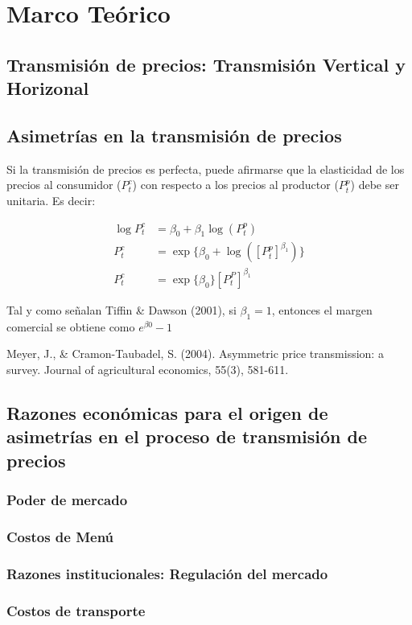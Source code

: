 \chapter{Marco Teórico}

\section{Transmisión de precios: Transmisión Vertical y Horizonal}
\section{Asimetrías en la transmisión de precios}

Si la transmisión de precios es perfecta, puede afirmarse que la elasticidad de los precios al consumidor ($P_{t}^{c}$) con respecto a los precios al productor ($P_{t}^{p}$) debe ser unitaria. Es decir: 

\begin{align}
\log P_{t}^{c} & = \beta_{0}+\beta_{1} \log(P_{t}^{p}) \\ 
P_{t}^{c} & = \exp\{\beta_{0}+ \log([P_{t}^{p}]^{\beta_{1}})\} \\
P_{t}^{c} & = \exp\{\beta_{0}\}[P_{t}^{P}]^{\beta_1} \label{margen}
\end{align}

Tal y como señalan Tiffin \& Dawson (2001), si $\beta_{1}=1$, entonces el margen comercial se obtiene como $e^{\beta0}-1$

Meyer, J., \& Cramon-Taubadel, S. (2004). Asymmetric price transmission: a survey. Journal of agricultural economics, 55(3), 581-611.

\section{Razones económicas para el origen de asimetrías en el proceso de transmisión de precios}
\subsection{Poder de mercado}
\subsection{Costos de Menú}
\subsection{Razones institucionales: Regulación del mercado}
\subsection{Costos de transporte}
